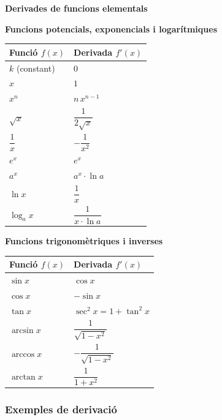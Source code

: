\documentclass[12pt]{article}
\begin{document}
\begin{concept}
\textbf{Derivades de funcions elementals}

\vspace{0.3cm}

\textbf{Funcions potencials, exponencials i logarítmiques}

\renewcommand{\arraystretch}{1.4}
\begin{center}
\begin{tabular}{|l|l|}
\hline
\textbf{Funció $f(x)$} & \textbf{Derivada $f'(x)$} \\
\hline
$k$ (constant) & $0$ \\
$x$ & $1$ \\
$x^n$ & $n\,x^{n-1}$ \\
$\sqrt{x}$ & $\dfrac{1}{2\sqrt{x}}$ \\
$\dfrac{1}{x}$ & $-\dfrac{1}{x^2}$ \\
$e^x$ & $e^x$ \\
$a^x$ & $a^x\cdot \ln a$ \\
$\ln x$ & $\dfrac{1}{x}$ \\
$\log_a x$ & $\dfrac{1}{x\cdot \ln a}$ \\
\hline
\end{tabular}
\end{center}

\vspace{0.5cm}

\textbf{Funcions trigonomètriques i inverses}

\renewcommand{\arraystretch}{1.4}
\begin{center}
\begin{tabular}{|l|l|}
\hline
\textbf{Funció $f(x)$} & \textbf{Derivada $f'(x)$} \\
\hline
$\sin x$ & $\cos x$ \\
$\cos x$ & $-\sin x$ \\
$\tan x$ & $\sec^2 x = 1+\tan^2 x$ \\
$\arcsin x$ & $\dfrac{1}{\sqrt{1-x^2}}$ \\
$\arccos x$ & $-\dfrac{1}{\sqrt{1-x^2}}$ \\
$\arctan x$ & $\dfrac{1}{1+x^2}$ \\
\hline
\end{tabular}
\end{center}
\end{concept}


\subsubsection{Exemples de derivació}
\end{document}
